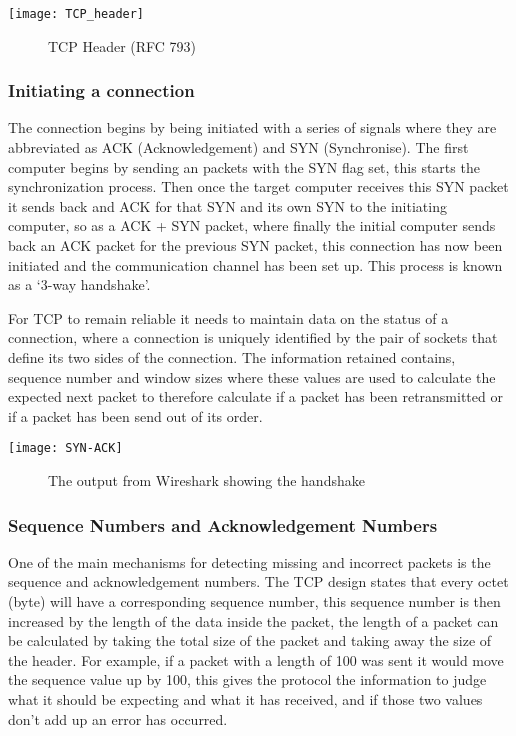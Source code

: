 \begin{center}
	\texttt{[image: TCP\_header]}
	\begin{figure}[h]
		\caption{TCP Header (RFC 793)}
	\end{figure}	
	
\end{center}

\subsubsection*{Initiating a connection}
The connection begins by being initiated with a series of signals where they are abbreviated as ACK (Acknowledgement) and SYN (Synchronise). The first computer begins by sending an packets with the SYN flag set, this starts the synchronization process. Then once the target computer receives this SYN packet it sends back and ACK for that SYN and its own SYN to the initiating computer, so as a ACK + SYN packet, where finally the initial computer sends back an ACK packet for the previous SYN packet, this connection has now been initiated and the communication channel has been set up. This process is known as a `3-way handshake'.

For TCP to remain reliable it needs to maintain data on the status of a connection, where a connection is uniquely identified by the pair of sockets that define its two sides of the connection. The information retained contains, sequence number and window sizes where these values are used to calculate the expected next packet to therefore calculate if a packet has been retransmitted or if a packet has been send out of its order.

\begin{center}
	\texttt{[image: SYN-ACK]}
	\begin{figure}[h]
		\caption{The output from Wireshark showing the handshake}
	\end{figure}
\end{center}


\subsubsection*{Sequence Numbers and Acknowledgement Numbers}
One of the main mechanisms for detecting missing and incorrect packets is the sequence and acknowledgement numbers. The TCP design states that every octet (byte) will have a corresponding sequence number, this sequence number is then increased by the length of the data inside the packet, the length of a packet can be calculated by taking the total size of the packet and taking away the size of the header. For example, if a packet with a length of 100 was sent it would move the sequence value up by 100, this gives the protocol the information to judge what it should be expecting and what it has received, and if those two values don't add up an error has occurred. 

